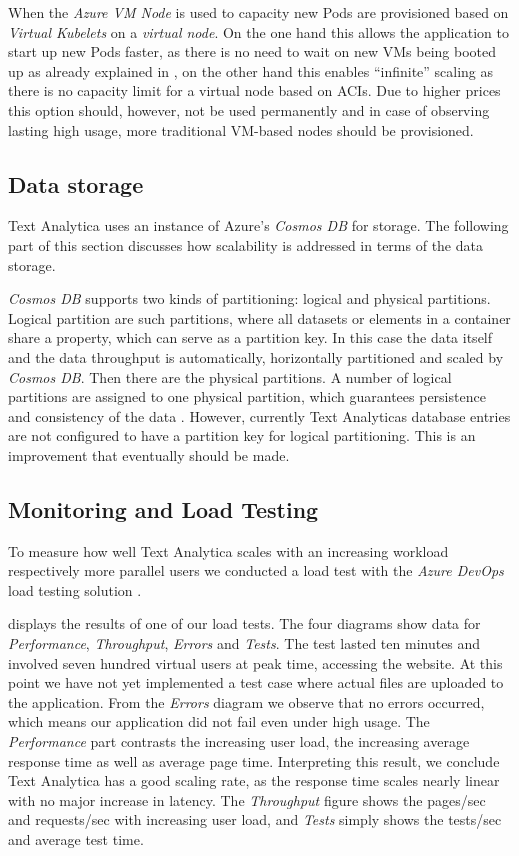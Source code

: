 \documentclass[conference]{IEEEtran}
\begin{document}
When the \textit{Azure VM Node} is used to capacity new Pods are provisioned based on \textit{Virtual Kubelets} on a \textit{virtual node}. On the one hand this allows the application to start up new Pods faster, as there is no need to wait on new VMs being booted up as already explained in , on the other hand this enables “infinite” scaling as there is no capacity limit for a virtual node based on ACIs. Due to higher prices this option should, however, not be used permanently and in case of observing lasting high usage, more traditional VM-based nodes should be provisioned.

\subsection{Data storage}
Text Analytica uses an instance of Azure's \textit{Cosmos DB} for storage. The following part of this section discusses how scalability is addressed in terms of the data storage.

\textit{Cosmos DB} supports two kinds of partitioning: logical and physical partitions. Logical partition are such partitions, where all datasets or elements in a container share a property, which can serve as a partition key. In this case the data itself and the data throughput is automatically, horizontally partitioned and scaled by \textit{Cosmos DB}. Then there are the physical partitions. A number of logical partitions are assigned to one physical partition, which guarantees persistence and consistency of the data \cite{CosmosDBHorScal}. However, currently Text Analyticas database entries are not configured to have a partition key for logical partitioning. This is an improvement that eventually should be made.

\subsection{Monitoring and Load Testing}
To measure how well Text Analytica scales with an increasing workload respectively more parallel users we conducted a load test with the \textit{Azure DevOps} load testing solution \cite{AzureLoadTest}.

 displays the results of one of our load tests. The four diagrams show data for \textit{Performance}, \textit{Throughput}, \textit{Errors} and \textit{Tests}. The test lasted ten minutes and involved seven hundred virtual users at peak time, accessing the website. At this point we have not yet implemented a test case where actual files are uploaded to the application. From the \textit{Errors} diagram we observe that no errors occurred, which means our application did not fail even under high usage. The \textit{Performance} part contrasts the increasing user load, the increasing average response time as well as average page time. Interpreting this result, we conclude Text Analytica has a good scaling rate, as the response time scales nearly linear with no major increase in latency. The \textit{Throughput} figure shows the pages/sec and requests/sec with increasing user load, and \textit{Tests} simply shows the tests/sec and average test time.
\end{document}
